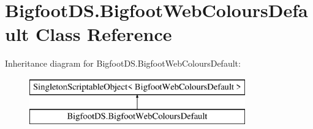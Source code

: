 \hypertarget{class_bigfoot_d_s_1_1_bigfoot_web_colours_default}{}\section{Bigfoot\+D\+S.\+Bigfoot\+Web\+Colours\+Default Class Reference}
\label{class_bigfoot_d_s_1_1_bigfoot_web_colours_default}
Inheritance diagram for Bigfoot\+D\+S.\+Bigfoot\+Web\+Colours\+Default\+:\begin{figure}[H]
\begin{center}
\leavevmode
\includegraphics[height=2.000000cm]{class_bigfoot_d_s_1_1_bigfoot_web_colours_default}
\end{center}
\end{figure}
